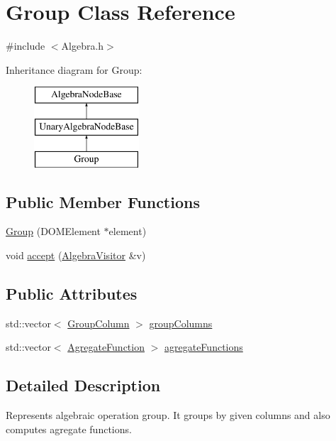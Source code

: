 \hypertarget{class_group}{\section{Group Class Reference}
\label{class_group}
}


{\ttfamily \#include $<$Algebra.\+h$>$}

Inheritance diagram for Group\+:\begin{figure}[H]
\begin{center}
\leavevmode
\includegraphics[height=3.000000cm]{class_group}
\end{center}
\end{figure}
\subsection*{Public Member Functions}
\begin{DoxyCompactItemize}
\item 
\hyperlink{class_group_ae331a9b7095f8c2481e2031d41d88164}{Group} (D\+O\+M\+Element $\ast$element)
\item 
void \hyperlink{class_group_a5286b05dd9be36f3a76d075a43191184}{accept} (\hyperlink{class_algebra_visitor}{Algebra\+Visitor} \&v)
\end{DoxyCompactItemize}
\subsection*{Public Attributes}
\begin{DoxyCompactItemize}
\item 
std\+::vector$<$ \hyperlink{class_group_column}{Group\+Column} $>$ \hyperlink{class_group_a811076e176eaa4e3bb8373b7bd515c7e}{group\+Columns}
\item 
std\+::vector$<$ \hyperlink{class_agregate_function}{Agregate\+Function} $>$ \hyperlink{class_group_afd02ca31d700990cddc2860d562635c2}{agregate\+Functions}
\end{DoxyCompactItemize}


\subsection{Detailed Description}
Represents algebraic operation group. It groups by given columns and also computes agregate functions. 

